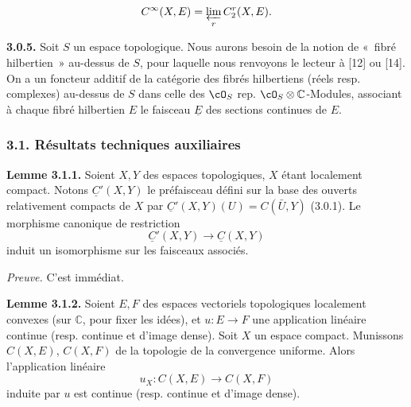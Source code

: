 \[
  C^\infty(X,E)=\varprojlim_r C^r_2(X,E).
\]

\textbf{3.0.5.}
Soit $S$ un espace topologique. Nous aurons besoin de la notion de «~fibré hilbertien~» au-dessus de $S$, pour laquelle nous renvoyons le lecteur à [12] ou [14]. On a un foncteur additif de la catégorie des fibrés hilbertiens (réels resp. complexes) au-dessus de $S$ dans celle des $\cO_S$ rep. $\cO_S\otimes\mathbb C$-Modules, associant à chaque fibré hilbertien $E$ le faisceau $\underline E$ des sections continues de $E$.

\subsubsection*{3.1. Résultats techniques auxiliaires}
\textbf{Lemme 3.1.1.} Soient $X,Y$ des espaces topologiques, $X$ étant localement compact. Notons $\underline C'(X,Y)$ le préfaisceau défini sur la base des ouverts relativement compacts de $X$ par $\underline C'(X,Y)(U)=C(\bar U,Y)$ (3.0.1). Le morphisme canonique de restriction
\[
  \underline C'(X,Y)\longrightarrow \underline C(X,Y)
\]
induit un isomorphisme sur les faisceaux associés.

\emph{Preuve.} C'est immédiat.

\textbf{Lemme 3.1.2.} Soient $E,F$ des espaces vectoriels topologiques localement convexes (sur $\mathbb C$, pour fixer les idées), et $u:E\to F$ une application linéaire continue (resp. continue et d'image dense). Soit $X$ un espace compact. Munissons $C(X,E)$, $C(X,F)$ de la topologie de la convergence uniforme. Alors l'application linéaire
\[
  u_X:C(X,E)\longrightarrow C(X,F)
\]
induite par $u$ est continue (resp. continue et d'image dense).

